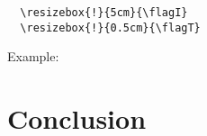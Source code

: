 \documentclass{article}
\begin{document}
\begin{verbatim}
  \resizebox{!}{5cm}{\flagI}
  \resizebox{!}{0.5cm}{\flagT}
\end{verbatim}

Example:

\resizebox{!}{5cm}{\flagI} \quad \resizebox{!}{0.5cm}{\flagT}

\section{Conclusion}

\begin{center}
\flagE \space \flagN \space \flagJ \space \flagO \space \flagY \\

\flagY \quad \flagO \quad \flagU \quad \flagR \\
\quad \flagS \quad \flagE \quad \flagL \quad \flagF
\end{center}
\end{document}
